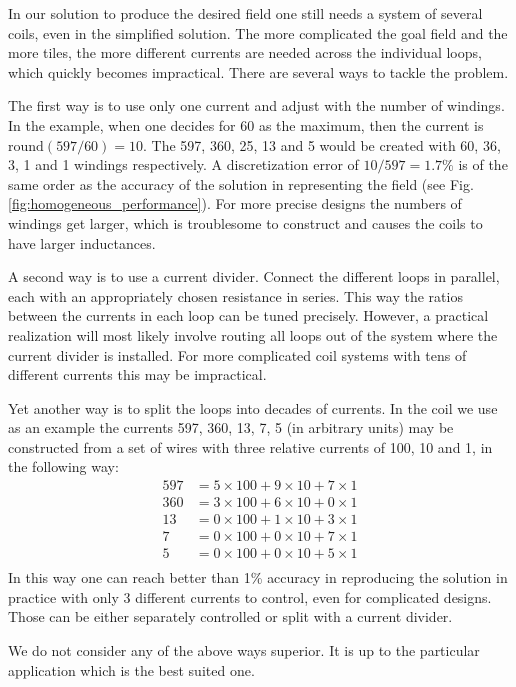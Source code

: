 In our solution to produce the desired field one still needs a system of several coils, even in the simplified solution. The more complicated the goal field and the more tiles, the more different currents are needed across the individual loops, which quickly becomes impractical. There are several ways to tackle the problem.

The first way is to use only one current and adjust with the number of windings. In the example, when one decides for 60 as the maximum, then the current is $\mathrm{round}(597 / 60) = 10$. The 597, 360, 25, 13 and 5 would be created with 60, 36, 3, 1 and 1 windings respectively. A discretization error of $10 / 597 = 1.7\%$ is of the same order as the accuracy of the solution in representing the field (see Fig.\,\ref{fig:homogeneous_performance}). For more precise designs the numbers of windings get larger, which is troublesome to construct and causes the coils to have larger inductances.

A second way is to use a current divider. Connect the different loops in parallel, each with an appropriately chosen resistance in series. This way the ratios between the currents in each loop can be tuned precisely. However, a practical realization will most likely involve routing all loops out of the system where the current divider is installed. For more complicated coil systems with tens of different currents this may be impractical.

Yet another way is to split the loops into decades of currents. In the coil we use as an example the currents 597, 360, 13, 7, 5 (in arbitrary units) may be constructed from a set of wires with three relative currents of 100, 10 and 1, in the following way:
\begin{align*}
  597 & = 5 \times 100 + 9 \times 10 + 7 \times 1 \\
  360 & = 3 \times 100 + 6 \times 10 + 0 \times 1 \\
  13 & = 0 \times 100 + 1 \times 10 + 3 \times 1 \\
  7 & = 0 \times 100 + 0 \times 10 + 7 \times 1 \\
  5 & = 0 \times 100 + 0 \times 10 + 5 \times 1 \\
\end{align*}
In this way one can reach better than 1\% accuracy in reproducing the solution in practice with only 3 different currents to control, even for complicated designs. Those can be either separately controlled or split with a current divider.

We do not consider any of the above ways superior. It is up to the particular application which is the best suited one.



